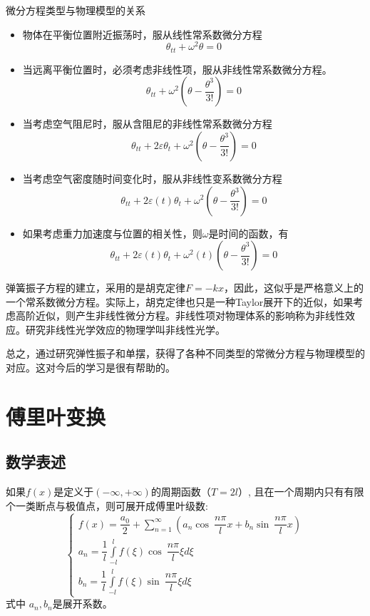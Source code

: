 \begin{hint} 微分方程类型与物理模型的关系
\begin{itemize}
	\item 物体在平衡位置附近振荡时，服从线性常系数微分方程
	$$ \theta _{tt} + \omega ^2 \theta =0 $$
	\item 当远离平衡位置时，必须考虑非线性项，服从非线性常系数微分方程。$$ \theta _{tt} + \omega ^2 (\theta - \frac{\theta^3}{3 !}) =0 $$
	\item 当考虑空气阻尼时，服从含阻尼的非线性常系数微分方程
$$ \theta _{tt} + 2\varepsilon \theta _{t} + \omega ^2 (\theta - \frac{\theta^3}{3 !}) =0 $$
\item 当考虑空气密度随时间变化时，服从非线性变系数微分方程
$$ \theta _{tt} + 2\varepsilon(t) \theta _{t} + \omega ^2 (\theta - \frac{\theta^3}{3 !}) =0 $$
\item 如果考虑重力加速度与位置的相关性，则$ \omega  $是时间的函数，有
$$ \theta _{tt} + 2\varepsilon(t) \theta _{t} + \omega^2(t)  (\theta - \frac{\theta^3}{3 !}) =0 $$
\end{itemize}

弹簧振子方程的建立，采用的是胡克定律$F=-kx$，因此，这似乎是严格意义上的一个常系数微分方程。实际上，胡克定律也只是一种Taylor展开下的近似，如果考虑高阶近似，则产生非线性微分方程。非线性项对物理体系的影响称为非线性效应。研究非线性光学效应的物理学叫非线性光学。

总之，通过研究弹性振子和单摆，获得了各种不同类型的常微分方程与物理模型的对应。这对今后的学习是很有帮助的。
\end{hint}


\section{傅里叶变换}
\subsection{数学表述}

如果$f(x)$是定义于$(-\infty,+\infty)$的周期函数（$T=2l$）, 且在一个周期内只有有限个一类断点与极值点，则可展开成傅里叶级数:
\begin{equation} \label{eq:fly1}
	\left\{ \begin{aligned}
	f(x) =\dfrac{a_0}{2} +\sum\limits_{n=1}^{\infty}  \left(  a_n \cos~ \dfrac{n\pi}{l} x +  b_n \sin~ \dfrac{n\pi}{l} x  \right) \\ 
	a_n =\dfrac{1}{l}  \int\limits_{-l}^{l}  f(\xi )   \cos~ \dfrac{n\pi}{l} \xi d\xi \\
	b_n =\dfrac{1}{l}  \int\limits_{-l}^{l}  f(\xi )   \sin~ \dfrac{n\pi}{l} \xi d\xi  
\end{aligned} \right. 
\end{equation}
式中 $a_n, b_n$是展开系数。

